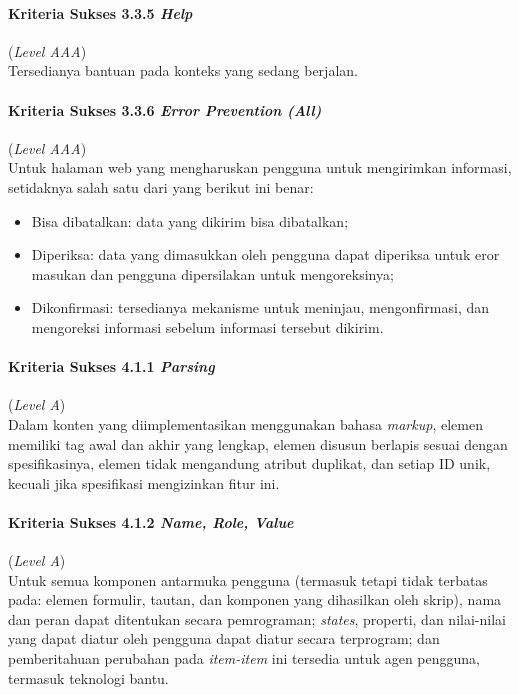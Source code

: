 \paragraph{Kriteria Sukses 3.3.5 \textit{Help}}
\label{subsec:kriteria_3.3.5}
(\textit{Level AAA}) \\

Tersedianya bantuan pada konteks yang sedang berjalan.


\paragraph{Kriteria Sukses 3.3.6 \textit{Error Prevention (All)}}
\label{subsec:kriteria_3.3.6}
(\textit{Level AAA}) \\

Untuk halaman web yang mengharuskan pengguna untuk mengirimkan informasi, setidaknya salah satu dari yang berikut ini benar:

\begin{itemize}
	\item Bisa dibatalkan: data yang dikirim bisa dibatalkan;
	\item Diperiksa: data yang dimasukkan oleh pengguna dapat diperiksa untuk eror masukan dan pengguna dipersilakan untuk mengoreksinya;
	\item Dikonfirmasi: tersedianya mekanisme untuk meninjau, mengonfirmasi, dan mengoreksi informasi sebelum informasi tersebut dikirim.
\end{itemize}

\paragraph{Kriteria Sukses 4.1.1 \textit{Parsing}}
\label{subsec:kriteria_4.1.1}
(\textit{Level A}) \\

Dalam konten yang diimplementasikan menggunakan bahasa \textit{markup}, elemen memiliki tag awal dan akhir yang lengkap, elemen disusun berlapis sesuai dengan spesifikasinya, elemen tidak mengandung atribut duplikat, dan setiap ID unik, kecuali jika spesifikasi mengizinkan fitur ini.

\paragraph{Kriteria Sukses 4.1.2 \textit{Name, Role, Value}}
\label{subsec:kriteria_4.1.2}
(\textit{Level A}) \\

Untuk semua komponen antarmuka pengguna (termasuk tetapi tidak terbatas pada: elemen formulir, tautan, dan komponen yang dihasilkan oleh skrip), nama dan peran dapat ditentukan secara pemrograman; \textit{states}, properti, dan nilai-nilai yang dapat diatur oleh pengguna dapat diatur secara terprogram; dan pemberitahuan perubahan pada \textit{item-item} ini tersedia untuk agen pengguna, termasuk teknologi bantu.

